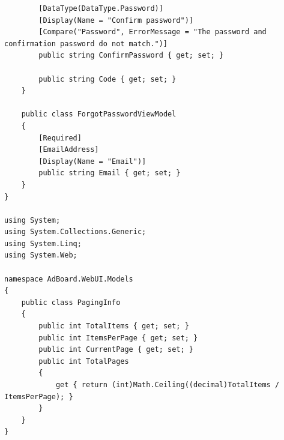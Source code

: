 \documentclass[14pt,a4paper]{extreport}
\begin{document}
\begin{lstlisting}
        [DataType(DataType.Password)]
        [Display(Name = "Confirm password")]
        [Compare("Password", ErrorMessage = "The password and confirmation password do not match.")]
        public string ConfirmPassword { get; set; }

        public string Code { get; set; }
    }

    public class ForgotPasswordViewModel
    {
        [Required]
        [EmailAddress]
        [Display(Name = "Email")]
        public string Email { get; set; }
    }
}

using System;
using System.Collections.Generic;
using System.Linq;
using System.Web;

namespace AdBoard.WebUI.Models
{
    public class PagingInfo
    {
        public int TotalItems { get; set; }
        public int ItemsPerPage { get; set; }
        public int CurrentPage { get; set; }
        public int TotalPages
        {
            get { return (int)Math.Ceiling((decimal)TotalItems / ItemsPerPage); }
        }
    }
}

\end{lstlisting}
	\lstset{style=sharpc}

	\newpage
\end{document}
